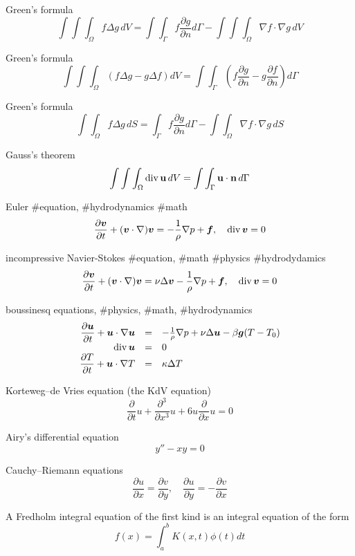 Green’s formula
$$
\int\int\int_\Omega f\Delta g \, dV=\int\int_\Gamma f\frac{\partial g}{\partial n}d\Gamma-\int\int\int_\Omega \nabla f\cdot\nabla g \, dV
$$

Green’s formula
$$
\int\int\int_\Omega (f\Delta g-g\Delta f) dV=\int\int_\Gamma \left(f\frac{\partial g}{\partial n}-g\frac{\partial f}{\partial n}\right)d\Gamma
$$

Green’s formula
$$
\int\int_\Omega f\Delta g \, dS=\int_\Gamma f\frac{\partial g}{\partial n}d\Gamma-\int\int_\Omega \nabla f\cdot\nabla g \, dS
$$

Gauss’s theorem
$$
\int\int\int_\Omega {\rm div \,} {\bf u} \, dV=\int\int_\Gamma {\bf u}\cdot{\bf n} \, d\Gamma
$$

Euler #equation, #hydrodynamics #math
$$
\frac{\partial {\boldsymbol v}}{\partial t}+({\boldsymbol v}\cdot\nabla){\boldsymbol v}=-\frac{1}{\rho}\nabla p+{\boldsymbol f}, \quad {\rm div}\,{\boldsymbol v}=0
$$

incompressive Navier-Stokes #equation, #math #physics #hydrodydamics
$$
\frac{\partial {\boldsymbol v}}{\partial t}+({\boldsymbol v}\cdot\nabla){\boldsymbol v}=\nu\Delta{\boldsymbol v}-\frac{1}{\rho}\nabla p+{\boldsymbol f}, \quad {\rm div}\,{\boldsymbol v}=0
$$

boussinesq equations, #physics, #math, #hydrodynamics
\begin{eqnarray}
\begin{array}{rll}
\displaystyle \frac{\partial {\boldsymbol u}}{\partial t}+{\boldsymbol u}\cdot\nabla {\boldsymbol {\boldsymbol u}} &=& -\frac{1}{\rho}\nabla p+\nu \Delta {\boldsymbol u}-\beta {\boldsymbol g}(T-T_0) \\
\displaystyle {\rm div}\, {\boldsymbol u}&=& 0 \\
\displaystyle \frac{\partial T}{\partial t}+{\boldsymbol u}\cdot\nabla T &=& \kappa\Delta T
\end{array} \nonumber
\end{eqnarray}

Korteweg–de Vries equation (the KdV equation) 
$$
\frac{\partial}{\partial t} u+\frac{\partial^3}{\partial x^3} u+6u\frac{\partial}{\partial x} u=0
$$

Airy’s differential equation
$$
y''-xy=0
$$

Cauchy–Riemann equations
$$
\frac{\partial u}{\partial x}=\frac{\partial v}{\partial y}, \quad \frac{\partial u}{\partial y}=-\frac{\partial v}{\partial x}
$$

A Fredholm integral equation of the first kind is an integral equation of the form
$$
f(x)=\int^b_a K(x,t)\phi(t)dt
$$

